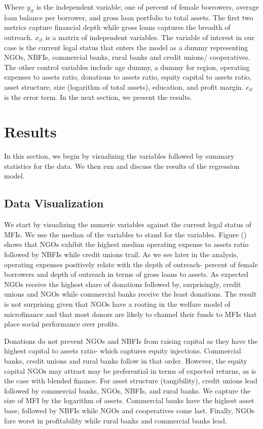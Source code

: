 \documentclass[
]{article}
\begin{document}
Where \(y_{it}\) is the independent variable; one of percent of female
borrowers, average loan balance per borrower, and gross loan portfolio
to total assets. The first two metrics capture financial depth while
gross loans captures the breadth of outreach. \(x_{it}\) is a matrix of
independent variables. The variable of interest in our case is the
current legal status that enters the model as a dummy representing NGOs,
NBFIs, commercial banks, rural banks and credit unions/ cooperatives.
The other control variables include age dummy, a dummy for region,
operating expenses to assets ratio, donations to assets ratio, equity
capital to assets ratio, asset structure, size (logarithm of total
assets), education, and profit margin. \(e_{it}\) is the error term. In
the next section, we present the results.

\hypertarget{results}{%
\section{\texorpdfstring{\textbf{Results}}{Results}}\label{results}}

In this section, we begin by visualizing the variables followed by
summary statistics for the data. We then run and discuss the results of
the regression model.

\hypertarget{data-visualization}{%
\subsection{\texorpdfstring{\textbf{Data
Visualization}}{Data Visualization}}\label{data-visualization}}

We start by visualizing the numeric variables against the current legal
status of MFIs. We use the median of the variables to stand for the
variables. Figure () shows that NGOs exhibit the highest median
operating expense to assets ratio followed by NBFIs while credit unions
trail. As we see later in the analysis, operating expenses positively
relate with the depth of outreach- percent of female borrowers and depth
of outreach in terms of gross loans to assets. As expected NGOs receive
the highest share of donations followed by, surprisingly, credit unions
and NGOs while commercial banks receive the least donations. The result
is not surprising given that NGOs have a rooting in the welfare model of
microfinance and that most donors are likely to channel their funds to
MFIs that place social performance over profits.

Donations do not prevent NGOs and NBFIs from raising capital as they
have the highest capital to assets ratio- which captures equity
injections. Commercial banks, credit unions and rural banks follow in
that order. However, the equity capital NGOs may attract may be
preferential in terms of expected returns, as is the case with blended
finance. For asset structure (tangibility), credit unions lead followed
by commercial banks, NGOs, NBFIs, and rural banks. We capture the size
of MFI by the logarithm of assets. Commercial banks have the highest
asset base, followed by NBFIs while NGOs and cooperatives come last.
Finally, NGOs fare worst in profitability while rural banks and
commercial banks lead.
\end{document}
